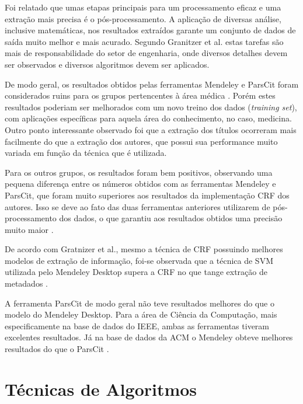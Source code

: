 \begin{textnew}
Foi relatado que umas etapas principais para um processamento eficaz e uma extração mais precisa é o pós-processamento. A aplicação de diversas análise, inclusive matemáticas, nos resultados extraídos garante um conjunto de dados de saída muito melhor e mais acurado. Segundo Granitzer et al. \cite{Granitzer-2012-LayoutBased} estas tarefas são mais de responsabilidade do setor de engenharia, onde diversos detalhes devem ser observados e diversos algoritmos devem ser aplicados.

De modo geral, os resultados obtidos pelas ferramentas Mendeley e ParsCit foram considerados ruins para os grupos pertencentes à área médica \cite{Granitzer-2012-LayoutBased}. Porém estes resultados poderiam ser melhorados com um novo treino dos dados (\emph{training set}), com aplicações específicas para aquela área do conhecimento, no caso, medicina. Outro ponto interessante observado foi que a extração dos títulos ocorreram mais facilmente do que a extração dos autores, que possui sua performance muito variada em função da técnica que é utilizada.

Para os outros grupos, os resultados foram bem positivos, observando uma pequena diferença entre os números obtidos com as ferramentas Mendeley e ParsCit, que foram muito superiores aos resultados da implementação CRF dos autores. Isso se deve ao fato das duas ferramentas anteriores utilizarem de pós-processamento dos dados, o que garantiu aos resultados obtidos uma precisão muito maior \cite{Granitzer-2012-LayoutBased}.

De acordo com Gratnizer et al., mesmo a técnica de CRF possuindo melhores modelos de extração de informação, foi-se observada que a técnica de SVM utilizada pelo Mendeley Desktop supera a CRF no que tange extração de metadados \cite{Granitzer-2012-LayoutBased}.

A ferramenta ParsCit de modo geral não teve resultados melhores do que o modelo do Mendeley Desktop. Para a área de Ciência da Computação, mais especificamente na base de dados do IEEE, ambas as ferramentas tiveram excelentes resultados. Já na base de dados da ACM o Mendeley obteve melhores resultados do que o ParsCit \cite{Granitzer-2012-LayoutBased}.

\end{textnew}

\section{Técnicas de Algoritmos}
\label{sec:algorithms-tecniques}

